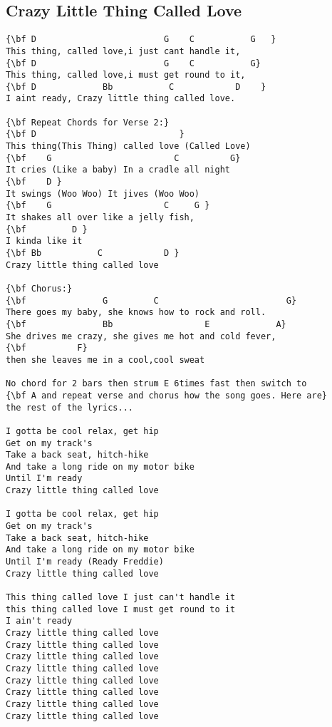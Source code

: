 \documentclass[a4paper]{article}
\begin{document}
\subsection{Crazy Little Thing Called Love} %
\label{sub:Crazy Little Thing Called Love}
\begin{Verbatim}[commandchars=\\\{\}]
{\bf D                         G    C           G   }
This thing, called love,i just cant handle it,
{\bf D                         G    C           G}
This thing, called love,i must get round to it,
{\bf D             Bb           C            D    }
I aint ready, Crazy little thing called love.

{\bf Repeat Chords for Verse 2:}
{\bf D                            }
This thing(This Thing) called love (Called Love)
{\bf    G                        C          G}
It cries (Like a baby) In a cradle all night
{\bf    D }
It swings (Woo Woo) It jives (Woo Woo)
{\bf    G                      C     G }
It shakes all over like a jelly fish,
{\bf         D }
I kinda like it
{\bf Bb           C            D }
Crazy little thing called love 

{\bf Chorus:}
{\bf               G         C                         G}
There goes my baby, she knows how to rock and roll.
{\bf               Bb                  E             A}
She drives me crazy, she gives me hot and cold fever,
{\bf          F}
then she leaves me in a cool,cool sweat

No chord for 2 bars then strum E 6times fast then switch to
{\bf A and repeat verse and chorus how the song goes. Here are}
the rest of the lyrics...

I gotta be cool relax, get hip 
Get on my track's 
Take a back seat, hitch-hike 
And take a long ride on my motor bike 
Until I'm ready 
Crazy little thing called love 

I gotta be cool relax, get hip 
Get on my track's 
Take a back seat, hitch-hike 
And take a long ride on my motor bike 
Until I'm ready (Ready Freddie) 
Crazy little thing called love 

This thing called love I just can't handle it 
this thing called love I must get round to it 
I ain't ready 
Crazy little thing called love 
Crazy little thing called love 
Crazy little thing called love 
Crazy little thing called love 
Crazy little thing called love 
Crazy little thing called love 
Crazy little thing called love 
Crazy little thing called love
\end{Verbatim}
\newpage
\end{document}
